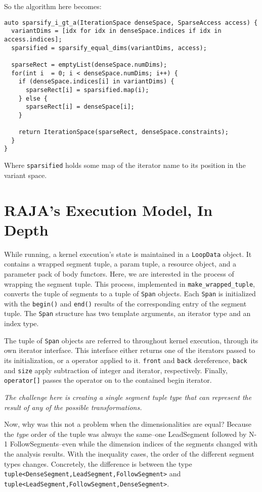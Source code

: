 So the algorithm here becomes:
\begin{lstlisting}
auto sparsify_i_gt_a(IterationSpace denseSpace, SparseAccess access) {
  variantDims = [idx for idx in denseSpace.indices if idx in access.indices];
  sparsified = sparsify_equal_dims(variantDims, access);
  
  sparseRect = emptyList(denseSpace.numDims);
  for(int i  = 0; i < denseSpace.numDims; i++) {
    if (denseSpace.indices[i] in variantDims) {
      sparseRect[i] = sparsified.map(i);
    } else {
      sparseRect[i] = denseSpace[i];
    }

    return IterationSpace(sparseRect, denseSpace.constraints);
  }
}
\end{lstlisting}
Where \verb.sparsified. holds some map of the iterator name to its position in the variant space.



\section{RAJA's Execution Model, In Depth}

While running, a kernel execution's state is maintained in a \verb.LoopData. object.
It contains a wrapped segment tuple, a param tuple, a resource object, and a parameter pack of body functors.
Here, we are interested in the process of wrapping the segment tuple. 
This process, implemented in \verb.make_wrapped_tuple., converts the tuple of segments to a tuple of \verb.Span. objects. 
Each \verb.Span. is initialized with the \verb.begin(). and \verb.end(). results of the corresponding entry of the segment tuple.
The \verb.Span. structure has two template arguments, an iterator type and an index type.

The tuple of \verb.Span. objects are referred to throughout kernel execution, through its own iterator interface. 
This interface either returns one of the iterators passed to its initialization, or a operator applied to it.
\verb.front. and \verb.back. dereference, \verb.back. and \verb.size. apply subtraction of integer and iterator, respectively.
Finally, \verb.operator[]. passes the operator on to the contained begin iterator.

\textit{The challenge here is creating a single segment tuple type that can represent the result of any of the possible transformations.}

Now, why was this not a problem when the dimensionalities are equal? 
Because the \textit{type} order of the tuple was always the same--one LeadSegment followed by N-1 FollowSegments--even while the dimension indices of the segments changed with the analysis results.
With the inequality cases, the order of the different segment types changes. 
Concretely, the difference is between the type \verb.tuple<DenseSegment,LeadSegment,FollowSegment>. and \verb.tuple<LeadSegment,FollowSegment,DenseSegment>..

